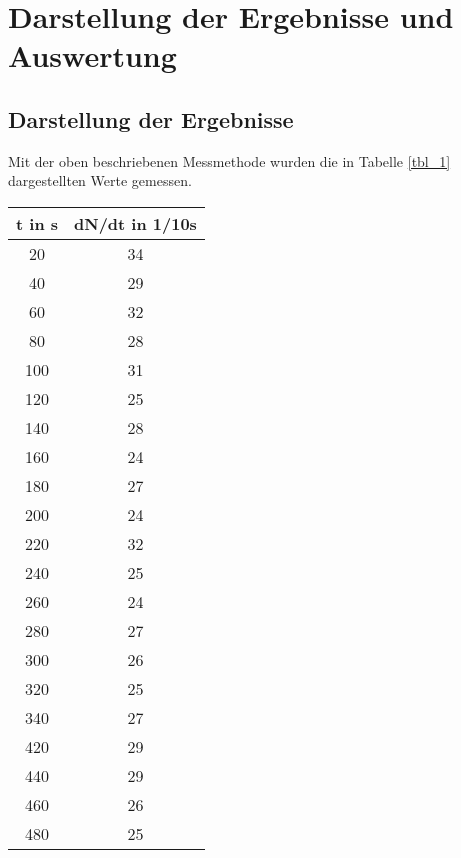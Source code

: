 \section{Darstellung der Ergebnisse und Auswertung}

\subsection{Darstellung der Ergebnisse}
Mit der oben beschriebenen Messmethode wurden die in Tabelle \ref{tbl_1} dargestellten Werte gemessen.
\begin{table}
\centering
\begin{tabular}{c|c}
t in s & dN/dt in 1/10s \\ 
\toprule
20	&34\\ 

40	&29\\ 

60	&32\\ 

80	&28\\ 

100	&31\\ 

120	&25\\ 

140	&28\\ 

160	&24\\ 

180	&27\\ 

200	&24\\ 

220	&32\\ 

240	&25\\ 

260	&24\\ 

280	&27\\ 
	
300	&26\\ 

320	&25\\ 

340	&27\\ 

420	&29\\ 
	
440	&29\\ 

460	&26\\ 

480	&25\\ 


\end{tabular}
\end{table}
